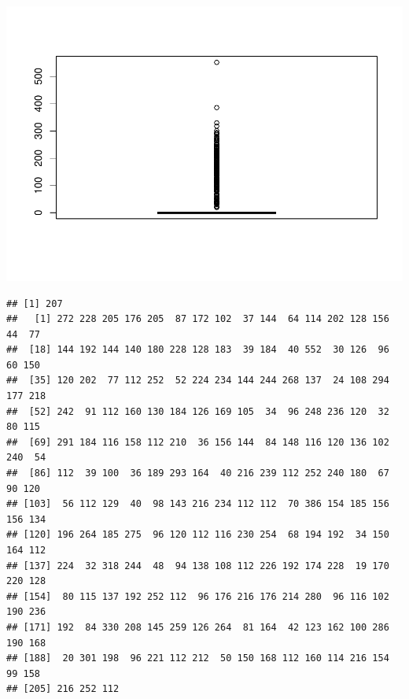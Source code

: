 \documentclass[]{article}
\begin{document}
\includegraphics{EDA_files/figure-latex/unnamed-chunk-91-1.pdf}

\begin{verbatim}
## [1] 207
##   [1] 272 228 205 176 205  87 172 102  37 144  64 114 202 128 156  44  77
##  [18] 144 192 144 140 180 228 128 183  39 184  40 552  30 126  96  60 150
##  [35] 120 202  77 112 252  52 224 234 144 244 268 137  24 108 294 177 218
##  [52] 242  91 112 160 130 184 126 169 105  34  96 248 236 120  32  80 115
##  [69] 291 184 116 158 112 210  36 156 144  84 148 116 120 136 102 240  54
##  [86] 112  39 100  36 189 293 164  40 216 239 112 252 240 180  67  90 120
## [103]  56 112 129  40  98 143 216 234 112 112  70 386 154 185 156 156 134
## [120] 196 264 185 275  96 120 112 116 230 254  68 194 192  34 150 164 112
## [137] 224  32 318 244  48  94 138 108 112 226 192 174 228  19 170 220 128
## [154]  80 115 137 192 252 112  96 176 216 176 214 280  96 116 102 190 236
## [171] 192  84 330 208 145 259 126 264  81 164  42 123 162 100 286 190 168
## [188]  20 301 198  96 221 112 212  50 150 168 112 160 114 216 154  99 158
## [205] 216 252 112
\end{verbatim}
\end{document}
